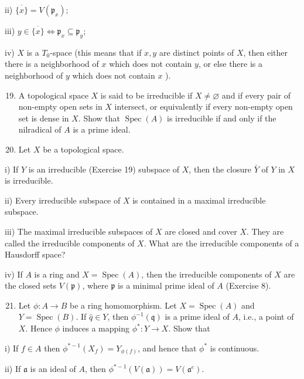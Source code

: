 \documentclass{standalone}
\theoremstyle{definition}
\theoremstyle{remark}
\begin{document}
ii) $\overline{\{x\}}=V\left(\mathfrak{p}_{x}\right)$;

iii) $y \in \overline{\{x\}} \Leftrightarrow \mathfrak{p}_{x} \subseteq \mathfrak{p}_{y}$;

iv) $X$ is a $T_{0}$-space (this means that if $x, y$ are distinct points of $X$, then either there is a neighborhood of $x$ which does not contain $y$, or else there is a neighborhood of $y$ which does not contain $x$ ).

\begin{enumerate}
  \setcounter{enumi}{18}
  \item A topological space $X$ is said to be irreducible if $X \neq \varnothing$ and if every pair of non-empty open sets in $X$ intersect, or equivalently if every non-empty open set is dense in $X$. Show that $\operatorname{Spec}(A)$ is irreducible if and only if the nilradical of $A$ is a prime ideal.

  \item Let $X$ be a topological space.

\end{enumerate}

i) If $Y$ is an irreducible (Exercise 19) subspace of $X$, then the closure $\bar{Y}$ of $Y$ in $X$ is irreducible.

ii) Every irreducible subspace of $X$ is contained in a maximal irreducible subspace.

iii) The maximal irreducible subspaces of $X$ are closed and cover $X$. They are called the irreducible components of $X$. What are the irreducible components of a Hausdorff space?

iv) If $A$ is a ring and $X=\operatorname{Spec}(A)$, then the irreducible components of $X$ are the closed sets $V(\mathfrak{p})$, where $\mathfrak{p}$ is a minimal prime ideal of $A$ (Exercise 8).

\begin{enumerate}
  \setcounter{enumi}{20}
  \item Let $\phi: A \rightarrow B$ be a ring homomorphism. Let $X=\operatorname{Spec}(A)$ and $Y=\operatorname{Spec}(B)$. If $\hat{q} \in Y$, then $\phi^{-1}(\mathfrak{q})$ is a prime ideal of $A$, i.e., a point of $X$. Hence $\phi$ induces a mapping $\phi^{*}: Y \rightarrow X$. Show that
\end{enumerate}

i) If $f \in A$ then $\phi^{*-1}\left(X_{f}\right)=Y_{\phi(f)}$, and hence that $\phi^{*}$ is continuous.

ii) If $\mathfrak{a}$ is an ideal of $A$, then $\phi^{*-1}(V(\mathfrak{a}))=V\left(\mathfrak{a}^{e}\right)$.
\end{document}
